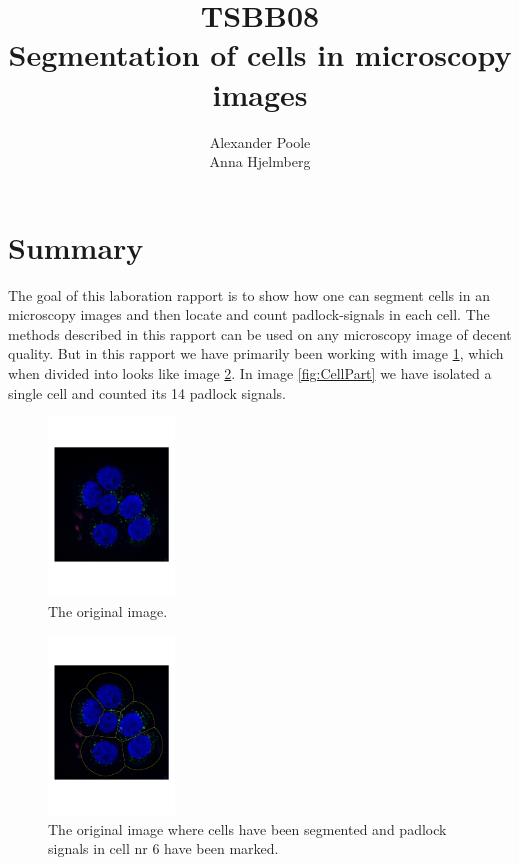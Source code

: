 \documentclass[10pt,twocolumn]{article}
\title{TSBB08 \\ Segmentation of cells in microscopy images}
\author{Alexander Poole \\ Anna Hjelmberg}
\begin{document}
\maketitle
	\thispagestyle{empty}
\newpage

\section{Summary}
The goal of this laboration rapport is to show how one can segment cells in an
microscopy images and then locate and count padlock-signals in each cell.
The methods described in this rapport can be used on any microscopy image of decent quality.
But in this rapport we have primarily been working with image \ref{fig:ImColour},
which when divided into looks like image \ref{fig:CellLinesNCircles}.
In image \ref{fig:CellPart} we have isolated a single cell and counted its 14 padlock signals.

\begin{figure}[ht]
\centering
\includegraphics[width=0.3\textwidth]{Bilder/ImColour.pdf}
\caption{The original image.}
\label{fig:ImColour}
\end{figure}

\begin{figure}[ht]
\centering
\includegraphics[width=0.3\textwidth]{Bilder/CellLinesNCircles.pdf}
\caption{The original image where cells have been segmented and padlock signals in cell nr 6 have been marked.}
\label{fig:CellLinesNCircles}
\end{figure}
\end{document}
